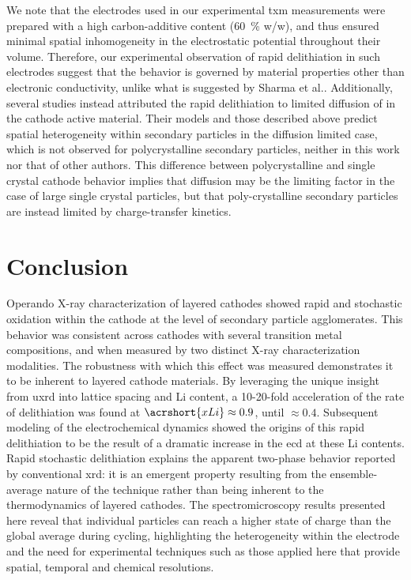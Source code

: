 \documentclass{article}
\begin{document}
We note that the electrodes used in our experimental \gls{txm}
measurements were prepared with a high carbon-additive content
(\SI{60}{\percent} w/w), and thus ensured minimal spatial
inhomogeneity in the electrostatic potential throughout their
volume. Therefore, our experimental observation of rapid delithiation
in such electrodes suggest that the behavior is governed by material
properties other than electronic conductivity, unlike what is
suggested by Sharma et al.\cite{zhao2022}. Additionally, several
studies instead attributed the rapid delithiation to limited diffusion
of  in the cathode active material\cite{rao2021,
  wang2020-6}. Their models and those described above predict spatial
heterogeneity within secondary particles in the diffusion limited
case\cite{wang2020-6}, which is not observed for polycrystalline
secondary particles, neither in this work nor that of other
authors\cite{chueh2021, zhao2022}. This difference between
polycrystalline and single crystal cathode behavior implies that
 diffusion may be the limiting factor in the case of large
single crystal particles, but that poly-crystalline secondary
particles are instead limited by charge-transfer kinetics.
 



\section{Conclusion}

Operando X-ray characterization of layered cathodes showed rapid and stochastic oxidation within the cathode
at the level of secondary particle agglomerates. This behavior was
consistent across cathodes with several transition metal compositions,
and when measured by two distinct X-ray characterization
modalities. The robustness with which this effect was measured
demonstrates it to be inherent to layered cathode
materials. By leveraging the unique insight from \gls{uxrd} into lattice spacing and Li content, a 10-20-fold acceleration of the rate of delithiation was found at $\acrshort{xLi} \approx 0.9$, until $\approx 0.4$. Subsequent modeling of the electrochemical dynamics showed
the origins of this rapid delithiation to be the result of a dramatic
increase in the \gls{ecd} at these Li contents. Rapid stochastic delithiation explains the
apparent two-phase behavior reported by conventional \gls{xrd}: it is
an emergent property resulting from the ensemble-average nature of the
technique rather than being inherent to the thermodynamics of layered
cathodes. The spectromicroscopy results presented here reveal that
individual particles can reach a higher state of charge than the
global average during cycling, highlighting the heterogeneity within
the electrode and the need for experimental techniques such as those
applied here that provide spatial, temporal and chemical resolutions.
\end{document}
